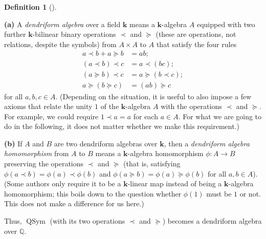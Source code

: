 \documentclass[numbers=enddot,12pt,final,onecolumn,notitlepage]{scrartcl}%
\theoremstyle{definition}
\newtheorem{defi}[theo]{Definition}
\newenvironment{definition}[1][]
{\begin{defi}[#1]\begin{leftbar}}
{\end{leftbar}\end{defi}}
\newenvironment{vershort}{}{}
\begin{document}
\begin{vershort}
\begin{definition}
\textbf{(a)} A \textit{dendriform algebra} over a field $\mathbf{k}$ means a
$\mathbf{k}$-algebra $A$ equipped with two further $\mathbf{k}$-bilinear
binary operations $\left.  \prec\right.  $ and $\left.  \succeq\right.  $
(these are operations, not relations, despite the symbols) from $A\times A$ to
$A$ that satisfy the four rules%
\begin{align*}
a\left.  \prec\right.  b+a\left.  \succeq\right.  b  &  =ab;\\
\left(  a\left.  \prec\right.  b\right)  \left.  \prec\right.  c  &  =a\left.
\prec\right.  \left(  bc\right)  ;\\
\left(  a\left.  \succeq\right.  b\right)  \left.  \prec\right.  c  &
=a\left.  \succeq\right.  \left(  b\left.  \prec\right.  c\right)  ;\\
a\left.  \succeq\right.  \left(  b\left.  \succeq\right.  c\right)   &
=\left(  ab\right)  \left.  \succeq\right.  c
\end{align*}
for all $a,b,c\in A$. (Depending on the situation, it is useful to also impose
a few axioms that relate the unity $1$ of the $\mathbf{k}$-algebra $A$ with
the operations $\left.  \prec\right.  $ and $\left.  \succeq\right.  $. For
example, we could require $1\left.  \prec\right.  a=a$ for each $a\in A$. For
what we are going to do in the following, it does not matter whether we make
this requirement.)

\textbf{(b)} If $A$ and $B$ are two dendriform algebras over $\mathbf{k}$,
then a \textit{dendriform algebra homomorphism} from $A$ to $B$ means a
$\mathbf{k}$-algebra homomorphism $\phi:A\rightarrow B$ preserving the
operations $\left.  \prec\right.  $ and $\left.  \succeq\right.  $ (that is,
satisfying $\phi\left(  a\left.  \prec\right.  b\right)  =\phi\left(
a\right)  \left.  \prec\right.  \phi\left(  b\right)  $ and $\phi\left(
a\left.  \succeq\right.  b\right)  =\phi\left(  a\right)  \left.
\succeq\right.  \phi\left(  b\right)  $ for all $a,b\in A$). (Some authors
only require it to be a $\mathbf{k}$-linear map instead of being a
$\mathbf{k}$-algebra homomorphism; this boils down to the question whether
$\phi\left(  1\right)  $ must be $1$ or not. This does not make a difference
for us here.)
\end{definition}

Thus, $\operatorname*{QSym}$ (with its two operations $\left.  \prec\right.  $
and $\left.  \succeq\right.  $) becomes a dendriform algebra over $\mathbb{Q}$.


\end{vershort}
\end{document}
